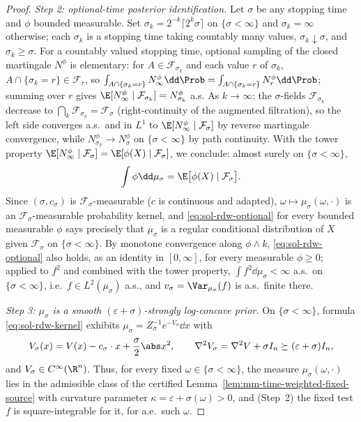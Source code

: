 \documentclass[../main.tex]{subfiles}
\begin{document}
\begin{proof}
\medskip
\noindent\emph{Step 2: optional-time posterior identification.}
Let $\sigma$ be any stopping time and $\phi$ bounded measurable.  Set
$\sigma_k=2^{-k}\lceil2^k\sigma\rceil$ on $\{\sigma<\infty\}$ and $\sigma_k=\infty$
otherwise; each $\sigma_k$ is a stopping time taking countably many values,
$\sigma_k\downarrow\sigma$, and $\sigma_k\ge\sigma$.  For a countably valued stopping
time, optional sampling of the closed martingale $N^\phi$ is elementary: for
$A\in\mathcal F_{\sigma_k}$ and each value $r$ of $\sigma_k$,
$A\cap\{\sigma_k=r\}\in\mathcal F_r$, so
$\int_{A\cap\{\sigma_k=r\}}N^\phi_\infty\dd\Prob
=\int_{A\cap\{\sigma_k=r\}}N^\phi_r\dd\Prob$; summing over $r$ gives
$\E[N^\phi_\infty\mid\mathcal F_{\sigma_k}]=N^\phi_{\sigma_k}$ a.s.
As $k\to\infty$: the $\sigma$-fields $\mathcal F_{\sigma_k}$ decrease to
$\bigcap_k\mathcal F_{\sigma_k}=\mathcal F_\sigma$ (right-continuity of the augmented
filtration), so the left side converges a.s.\ and in $L^1$ to
$\E[N^\phi_\infty\mid\mathcal F_\sigma]$ by reverse martingale convergence, while
$N^\phi_{\sigma_k}\to N^\phi_\sigma$ on $\{\sigma<\infty\}$ by path continuity.  With
the tower property $\E[N^\phi_\infty\mid\mathcal F_\sigma]
=\E[\phi(X)\mid\mathcal F_\sigma]$, we conclude: almost surely on
$\{\sigma<\infty\}$,
\begin{equation}
  \int\phi\dd\mu_\sigma=\E\bigl[\phi(X)\mid\mathcal F_\sigma\bigr] .
  \label{eq:sol-rdw-optional}
\end{equation}
Since $(\sigma,c_\sigma)$ is $\mathcal F_\sigma$-measurable ($c$ is continuous and
adapted), $\omega\mapsto\mu_\sigma(\omega,\cdot)$ is an
$\mathcal F_\sigma$-measurable probability kernel, and \eqref{eq:sol-rdw-optional} for
every bounded measurable $\phi$ says precisely that $\mu_\sigma$ is a regular
conditional distribution of $X$ given $\mathcal F_\sigma$ on $\{\sigma<\infty\}$.
By monotone convergence along $\phi\wedge k$, \eqref{eq:sol-rdw-optional} also holds,
as an identity in $[0,\infty]$, for every measurable $\phi\ge0$; applied to $f^2$
and combined with the tower property, $\int f^2\dd\mu_\sigma<\infty$ a.s.\ on
$\{\sigma<\infty\}$, i.e.\ $f\in L^2(\mu_\sigma)$ a.s., and
$v_\sigma=\Var_{\mu_\sigma}(f)$ is a.s.\ finite there.

\medskip
\noindent\emph{Step 3: $\mu_\sigma$ is a smooth $(\varepsilon+\sigma)$-strongly
log-concave prior.}
On $\{\sigma<\infty\}$, formula \eqref{eq:sol-rdw-kernel} exhibits
$\mu_\sigma=Z_\sigma^{-1}e^{-V_\sigma}\dd x$ with
\[
  V_\sigma(x)=V(x)-c_\sigma\cdot x+\frac\sigma2\abs x^2,
  \qquad
  \nabla^2V_\sigma=\nabla^2V+\sigma I_n\succeq(\varepsilon+\sigma)I_n,
\]
and $V_\sigma\in C^\infty(\R^n)$.  Thus, for every fixed $\omega\in\{\sigma<\infty\}$,
the measure $\mu_\sigma(\omega,\cdot)$ lies in the admissible class of the certified
Lemma~\ref{lem:mm-time-weighted-fixed-source} with curvature parameter
$\kappa=\varepsilon+\sigma(\omega)>0$, and (Step~2) the fixed test $f$ is
square-integrable for it, for a.e.\ such $\omega$.


\end{proof}
\end{document}
